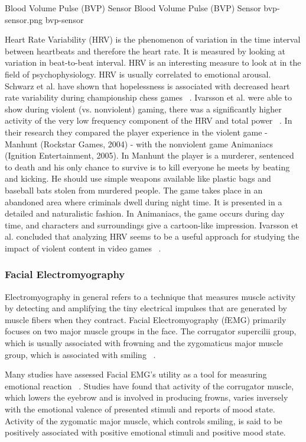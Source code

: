\img
{Blood Volume Pulse (BVP) Sensor}
{Blood Volume Pulse (BVP) Sensor}
{bvp-sensor.png}
{bvp-sensor}

Heart Rate Variability (HRV) is the phenomenon of variation in the time interval between heartbeats and therefore the heart rate. It is measured by looking at variation in beat-to-beat interval. HRV is an interesting measure to look at in the field of psychophysiology. HRV is usually correlated to emotional arousal. Schwarz et al. have shown that hopelessness is associated with decreased heart rate variability during championship chess games ~\cite{schwarz2003hopelessness}. Ivarsson et al. were able to show during violent (vs. nonviolent) gaming, there was a significantly higher activity of the very low frequency component of the HRV and total power ~\cite{ivarsson2009playing}. In their research they compared the player experience in the violent game - Manhunt (Rockstar Games, 2004) - with the nonviolent game Animaniacs (Ignition Entertainment, 2005). In Manhunt the player is a murderer, sentenced to death and his only chance to survive is to kill everyone he meets by beating and kicking. He should use simple weapons available like plastic bags and baseball bats stolen from murdered people. The game takes place in an abandoned area where criminals dwell during night time. It is presented in a detailed and naturalistic fashion. In Animaniacs, the game occurs during day time, and characters and surroundings give a cartoon-like impression. Ivarsson et al. concluded that analyzing HRV seems to be a useful approach for studying the impact of violent content in video games ~\cite{ivarsson2009playing}.

\subsubsection{Facial Electromyography}

Electromyography in general refers to a technique that measures muscle activity by detecting and amplifying the tiny electrical impulses that are generated by muscle fibers when they contract. Facial Electromyography (fEMG) primarily focuses on two major muscle groups in the face. The corrugator supercilii group, which is usually associated with frowning and the zygomaticus major muscle group, which is associated with smiling ~\cite{larsen2003effects, sato2008enhanced}.

Many studies have assessed Facial EMG's utility as a tool for measuring emotional reaction ~\cite{dimberg1990facial}. Studies have found that activity of the corrugator muscle, which lowers the eyebrow and is involved in producing frowns, varies inversely with the emotional valence of presented stimuli and reports of mood state. Activity of the zygomatic major muscle, which controls smiling, is said to be positively associated with positive emotional stimuli and positive mood state.

